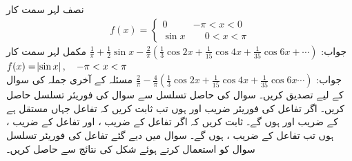 \quad نصف لہر سمت کار
\begin{align*}
f(x)=
\begin{cases}
0& -\pi<x<0\\
\sin x&\phantom{-} 0<x<\pi
\end{cases}
\end{align*}
جواب:\quad
$\tfrac{1}{\pi}+\frac{1}{2}\sin x-\tfrac{2}{\pi}(\frac{1}{3}\cos 2x+\tfrac{1}{15}\cos 4x+\tfrac{1}{35}\cos 6x+\cdots)$
\quad مکمل لہر سمت کار
$f(x)=\abs{\sin x},\quad  -\pi<x<\pi$\\
جواب:\quad
$\tfrac{2}{\pi}-\tfrac{4}{\pi}(\tfrac{1}{3}\cos 2x+\tfrac{1}{15}\cos 4x+\frac{1}{35}\cos 6x\cdots)$
\quad مسئلہ  کے آخری جملہ کی سوال  کے لیے  تصدیق کریں۔ 
\quad سوال  کی حاصل تسلسل سے سوال  کی فوریئر تسلسل حاصل کریں۔
\quad اگر تفاعل  کی فوریئر  ضریب   اور  ہوں تب ثابت کریں کہ تفاعل  جہاں  مستقل ہے کے  ضریب 
 اور  ہوں گے۔
\quad ثابت کریں کہ اگر تفاعل  کے  ضریب  ،  اور تفاعل  کے  ضریب  ،  ہوں تب تفاعل  کے  ضریب  ،  ہوں گے۔
\quad سوال  میں دیے گئے تفاعل کی فوریئر تسلسل سوال  کو استعمال کرتے ہوئے شکل  کی نتائج سے  حاصل کریں۔

